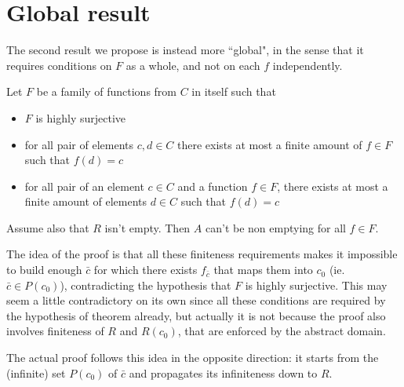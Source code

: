 \section{Global result}
The second result we propose is instead more ``global", in the sense that it requires conditions on $F$ as a whole, and not on each $f$ independently.

\begin{theorem}\label{ch4:th:non-empt-res-global}
	Let $F$ be a family of functions from $C$ in itself such that
	\begin{itemize}
		\item $F$ is highly surjective
		\item for all pair of elements $c, d \in C$ there exists at most a finite amount of $f \in F$ such that $f(d) = c$
		\item for all pair of an element $c \in C$ and a function $f \in F$, there exists at most a finite amount of elements $d \in C$ such that $f(d) = c$
	\end{itemize}
	Assume also that $R$ isn't empty. Then $A$ can't be non emptying for all $f \in F$.
\end{theorem}

The idea of the proof is that all these finiteness requirements makes it impossible to build enough $\bar{c}$ for which there exists $f_{\bar{c}}$ that maps them into $c_0$ (ie. $\bar{c} \in P(c_0)$), contradicting the hypothesis that $F$ is highly surjective. This may seem a little contradictory on its own since all these conditions are required by the hypothesis of theorem already, but actually it is not because the proof also involves finiteness of $R$ and $R(c_0)$, that are enforced by the abstract domain.

The actual proof follows this idea in the opposite direction: it starts from the (infinite) set $P(c_0)$ of $\bar{c}$ and propagates its infiniteness down to $R$.

